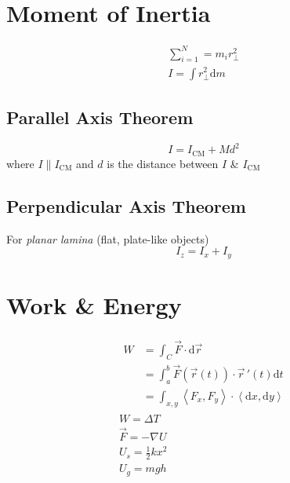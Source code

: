 \documentclass[tbtags]{cheatsheet}
\begin{document}
	\section{Moment of Inertia}
	\begin{gather*}
		\sum_{i=1}^{N} = m_i r^2_\perp \tag{summation}\\
		I = \int r^2_\perp \mathrm{d}m	\tag{integral}
	\end{gather*}
		\subsection{Parallel Axis Theorem}
			\[ I = I_\mathrm{CM} + Md^2 \]
			where $I \parallel I_\mathrm{CM}$ and $d$ is the distance between $I$ \& $I_\mathrm{CM}$

		\subsection{Perpendicular Axis Theorem}
			For \emph{planar lamina} (flat, plate-like objects)
			\[ I_z = I_x + I_y \]


	\section{Work \& Energy}
		\begin{gather*}
			\begin{split}
			W &= \int_C \vec{F} \cdot \mathrm{d}\vec{r}	\\
			&= \int_{a}^b \vec{F}\left( \vec{r}(t) \right) \cdot \vec{r}\,'(t)\mathrm{d}t \\
			&= \int_{x,y} \left\langle F_x, F_y \right\rangle \cdot \left\langle \mathrm{d}x, \mathrm{d}y \right\rangle
			\end{split}\tag{work integral}\\
			W = \Delta T	\tag{Work-Energy Theorem}\\
			\vec F = -\nabla U	\tag{potential from force}\\
			U_s = \frac{1}{2}kx^2	\tag{spring potential energy}\\
			U_g = mgh				\tag{gravitational potential energy}
		\end{gather*}

\end{document}
